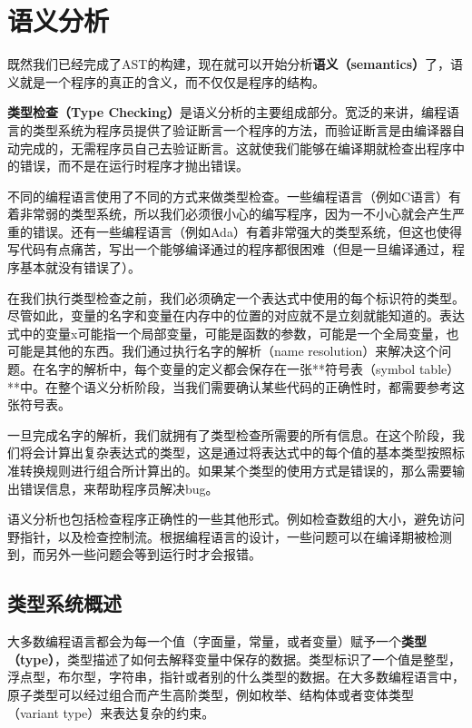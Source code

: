 \documentclass[cn,11pt,chinese]{elegantbook}
\begin{document}
\chapter{语义分析}

既然我们已经完成了AST的构建，现在就可以开始分析\textbf{语义（semantics）}了，语义就是一个程序的真正的含义，而不仅仅是程序的结构。

\textbf{类型检查（Type Checking）}是语义分析的主要组成部分。宽泛的来讲，编程语言的类型系统为程序员提供了验证断言一个程序的方法，而验证断言是由编译器自动完成的，无需程序员自己去验证断言。这就使我们能够在编译期就检查出程序中的错误，而不是在运行时程序才抛出错误。

不同的编程语言使用了不同的方式来做类型检查。一些编程语言（例如C语言）有着非常弱的类型系统，所以我们必须很小心的编写程序，因为一不小心就会产生严重的错误。还有一些编程语言（例如Ada）有着非常强大的类型系统，但这也使得写代码有点痛苦，写出一个能够编译通过的程序都很困难（但是一旦编译通过，程序基本就没有错误了）。

在我们执行类型检查之前，我们必须确定一个表达式中使用的每个标识符的类型。尽管如此，变量的名字和变量在内存中的位置的对应就不是立刻就能知道的。表达式中的变量x可能指一个局部变量，可能是函数的参数，可能是一个全局变量，也可能是其他的东西。我们通过执行名字的解析（name resolution）来解决这个问题。在名字的解析中，每个变量的定义都会保存在一张**符号表（symbol table）**中。在整个语义分析阶段，当我们需要确认某些代码的正确性时，都需要参考这张符号表。

一旦完成名字的解析，我们就拥有了类型检查所需要的所有信息。在这个阶段，我们将会计算出复杂表达式的类型，这是通过将表达式中的每个值的基本类型按照标准转换规则进行组合所计算出的。如果某个类型的使用方式是错误的，那么需要输出错误信息，来帮助程序员解决bug。

语义分析也包括检查程序正确性的一些其他形式。例如检查数组的大小，避免访问野指针，以及检查控制流。根据编程语言的设计，一些问题可以在编译期被检测到，而另外一些问题会等到运行时才会报错。

\section{类型系统概述}

大多数编程语言都会为每一个值（字面量，常量，或者变量）赋予一个\textbf{类型（type）}，类型描述了如何去解释变量中保存的数据。类型标识了一个值是整型，浮点型，布尔型，字符串，指针或者别的什么类型的数据。在大多数编程语言中，原子类型可以经过组合而产生高阶类型，例如枚举、结构体或者变体类型（variant type）来表达复杂的约束。
\end{document}
